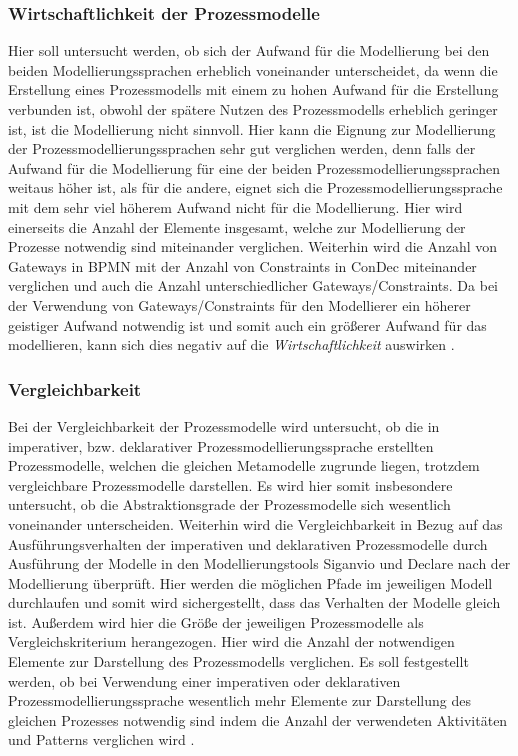 \subsubsection{Wirtschaftlichkeit der Prozessmodelle}
Hier soll untersucht werden, ob sich der Aufwand für die Modellierung bei den beiden Modellierungssprachen erheblich voneinander unterscheidet, da wenn die Erstellung eines Prozessmodells mit einem zu hohen Aufwand für die Erstellung verbunden ist, obwohl der spätere Nutzen des Prozessmodells erheblich geringer ist, ist die Modellierung nicht sinnvoll. Hier kann die Eignung zur Modellierung der Prozessmodellierungssprachen sehr gut verglichen werden, denn falls der Aufwand für die Modellierung für eine der beiden Prozessmodellierungssprachen weitaus höher ist, als für die andere, eignet sich die Prozessmodellierungssprache mit dem sehr viel höherem Aufwand nicht für die Modellierung.\newline
Hier wird einerseits die Anzahl der Elemente insgesamt, welche zur Modellierung der Prozesse notwendig sind miteinander verglichen. Weiterhin wird die Anzahl von Gateways in BPMN mit der Anzahl von Constraints in ConDec miteinander verglichen und auch die Anzahl unterschiedlicher Gateways/Constraints. Da bei der Verwendung von Gateways/Constraints für den Modellierer ein höherer geistiger Aufwand notwendig ist und somit auch ein größerer Aufwand für das modellieren, kann sich dies negativ auf die \textit{Wirtschaftlichkeit} auswirken \cite{freund2007, journals95, leimeister2012}.


\subsubsection{Vergleichbarkeit}
Bei der Vergleichbarkeit der Prozessmodelle wird untersucht, ob die in imperativer, bzw. deklarativer Prozessmodellierungssprache erstellten Prozessmodelle, welchen die gleichen Metamodelle zugrunde liegen, trotzdem vergleichbare Prozessmodelle darstellen. Es wird hier somit insbesondere untersucht, ob die Abstraktionsgrade der Prozessmodelle sich wesentlich voneinander unterscheiden. Weiterhin wird die Vergleichbarkeit in Bezug auf das Ausführungsverhalten der imperativen und deklarativen Prozessmodelle durch Ausführung der Modelle in den Modellierungstools Siganvio und Declare nach der Modellierung überprüft. Hier werden die möglichen Pfade im jeweiligen Modell durchlaufen und somit wird sichergestellt, dass das Verhalten der Modelle gleich ist. Außerdem wird hier die Größe der jeweiligen Prozessmodelle als Vergleichskriterium herangezogen. Hier wird die Anzahl der notwendigen Elemente zur Darstellung des Prozessmodells verglichen. Es soll festgestellt werden, ob bei Verwendung einer imperativen oder deklarativen Prozessmodellierungssprache wesentlich mehr Elemente zur Darstellung des gleichen Prozesses notwendig sind indem die Anzahl der verwendeten Aktivitäten und Patterns verglichen wird \cite{leimeister2012, journals95, freund2007,reinshagen2009}.

